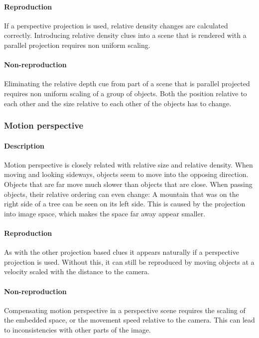 \paragraph{Reproduction}
If a perspective projection is used, relative density changes are calculated correctly. Introducing relative density clues into a scene that is rendered with a parallel projection requires non uniform scaling.

\paragraph{Non-reproduction}
Eliminating the relative depth cue from part of a scene that is parallel projected requires non uniform scaling of a group of objects.
Both the position relative to each other and the size relative to each other of the objects has to change.


\subsubsection{Motion perspective}
\paragraph{Description}
Motion perspective is closely related with relative size and relative density.
When moving and looking sideways, objects seem to move into the opposing direction.
Objects that are far move much slower than objects that are close.
When passing objects, their relative ordering can even change: A mountain that was on the right side of a tree can be seen on its left side.
This is caused by the projection into image space, which makes the space far away appear smaller.

\paragraph{Reproduction}
As with the other projection based clues it appears naturally if a perspective projection is used. Without this, it can still be reproduced by moving objects at a velocity scaled with the distance to the camera.

\paragraph{Non-reproduction}
Compensating motion perspective in a perspective scene requires the scaling of the embedded space, or the movement speed relative to the camera. This can lead to inconsistencies with other parts of the image.


